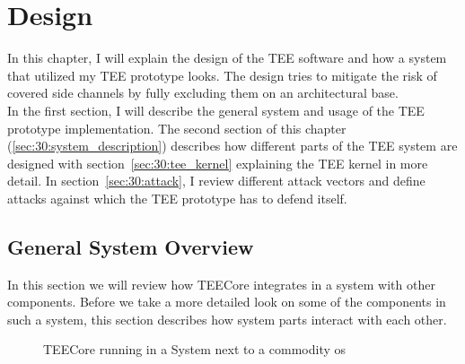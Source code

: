 \chapter{Design}
\label{sec:design}



In this chapter, I will explain the design of the TEE software and how a system
that utilized my TEE prototype looks. The design tries to mitigate the risk of
covered side channels by fully excluding them on an architectural base.\\

In the first section, I will describe the general system and usage of the TEE
prototype implementation. The second section of this chapter
(\ref{sec:30:system_description}) describes how different parts of the TEE system
are designed with section~\ref{sec:30:tee_kernel}  explaining the TEE kernel in
more detail. In section~\ref{sec:30:attack}, I review different attack vectors
and define attacks against which the TEE prototype has to defend itself.

\section{General System Overview}
In this section we will review how TEECore integrates in a system with other
components. Before we take a more detailed look on some of the components in
such a system, this section describes how system parts interact with each other.

\label{sec:30:system_overview}
\begin{figure}
    \begin{center}
        
        \caption{TEECore running in a System next to a commodity \gls{os}}
        \label{fig:30:tee_system_design}
    \end{center}
\end{figure}

